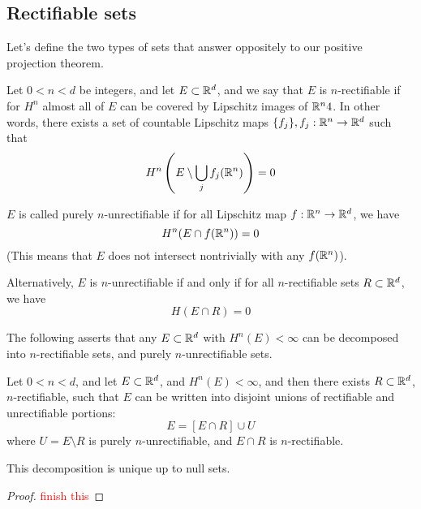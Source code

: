 \subsection{Rectifiable sets}
Let's define the two types of sets that answer oppositely to our positive projection theorem.
\begin{definition}[rectifiable]
    Let $0<n<d$ be integers, and let $E\subset\mathbb{R}^d$, and we say that $E$ is $n$-rectifiable if for $H^n$ almost all of $E$ can be covered by Lipschitz images of $\mathbb{R}^n4$. In other words, there exists a set of countable Lipschitz maps $\{f_j\}, f_j:\mathbb{R}^n\to\mathbb{R}^d$ such that
    \begin{equation*}
        H^n\left( E\setminus \bigcup_jf_j(\mathbb{R}^n)\right)=0
    \end{equation*}
\end{definition}
\begin{definition}[n-unrectifiable]
    $E$ is called purely $n$-unrectifiable if for all Lipschitz map $f:\mathbb{R}^n\to\mathbb{R}^d$, we have
    \begin{equation*}
        H^n(E\cap f(\mathbb{R}^n))=0
    \end{equation*}
    (This means that $E$ does not intersect nontrivially with any $f(\mathbb{R}^n)$). 

    Alternatively, $E$ is $n$-unrectifiable if and only if for all $n$-rectifiable sets $R\subset\mathbb{R}^d$, we have
    \begin{equation*}
        H(E\cap R)=0
    \end{equation*}
\end{definition}
The following asserts that any $E\subset\mathbb{R}^d$ with $H^n(E)<\infty$ can be decomposed into $n$-rectifiable sets, and purely $n$-unrectifiable sets.
\begin{theorem}
    Let $0<n<d$, and let $E\subset\mathbb{R}^d$, and $H^n(E)<\infty$, and then there exists $R\subset\mathbb{R}^d$, $n$-rectifiable, such that $E$ can be written into disjoint unions of rectifiable and unrectifiable portions:
    \begin{equation*}
        E=[E\cap R]\cup U
    \end{equation*}
    where $U=E\setminus R$ is purely $n$-unrectifiable, and $E\cap R$ is $n$-rectifiable.
\end{theorem}
\begin{note}
    This decomposition is unique up to null sets.
\end{note}
\begin{proof}
    \textcolor{red}{finish this}
\end{proof}

